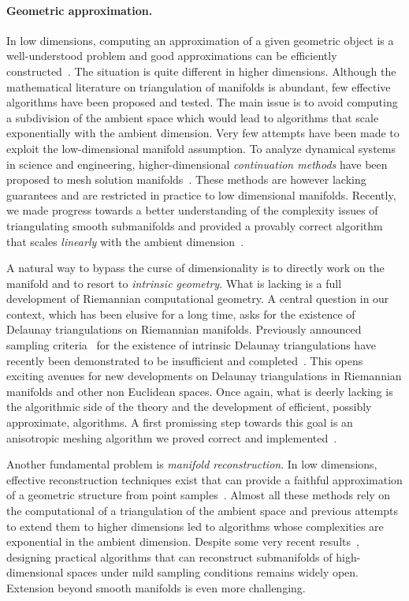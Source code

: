 \paragraph{Geometric approximation.}
In low dimensions, computing an approximation of a given geometric object is a well-understood problem and good approximations can be efficiently constructed~\cite{geometrica-bcmrv-ms-06,he-gtmg-2001}.  The situation is quite different in higher dimensions.  Although the mathematical literature on triangulation of manifolds is abundant, few effective algorithms have been proposed and tested.  The main issue is to avoid computing a subdivision of the ambient space which would lead to algorithms that scale exponentially with the ambient dimension. Very few attempts have been made to exploit the  low-dimensional manifold assumption.
To analyze {dynamical systems} in science and engineering, higher-dimensional {\em continuation methods} have been proposed to mesh solution manifolds~\cite{mh-mpc-2002}. These methods are however lacking guarantees and are restricted in practice to low dimensional manifolds. 
Recently, we made progress towards a better understanding of the complexity issues of triangulating smooth submanifolds and provided a provably correct algorithm that scales {\em linearly} with the ambient dimension~\cite{boissonnat2010meshing}. 

A natural way to bypass the curse of dimensionality is to directly work on the manifold and to resort to {\em intrinsic geometry}. What is lacking is a full development of Riemannian computational geometry. A central question in our context, which has been elusive for a long time, asks for the existence of Delaunay triangulations on Riemannian manifolds. Previously announced sampling criteria~\cite{leibon2000} for the existence of intrinsic Delaunay triangulations have recently been demonstrated to be insufficient and completed~\cite{boissonnat2012stab}. This opens exciting avenues for new developments on Delaunay triangulations in Riemannian manifolds and other non Euclidean spaces. Once again, what is deerly lacking is the algorithmic side of the theory and the development of efficient, possibly approximate, algorithms.  A first promissing step towards this goal is an anisotropic meshing algorithm we proved correct and implemented~\cite{bwy-luam-08}.

Another fundamental problem is {\em manifold reconstruction}.  In low dimensions, effective reconstruction techniques exist that can provide a faithful approximation of a geometric structure from point samples~\cite{dey-csr-2007}. %
Almost all these methods rely on the computational of a triangulation of the ambient space and previous attempts to extend them to higher dimensions led to algorithms whose complexities are exponential in the ambient dimension.  Despite some very recent results~\cite{geometrica-7142i}, designing practical algorithms that can reconstruct submanifolds of high-dimensional spaces under mild sampling conditions remains widely open. Extension beyond smooth manifolds 
is even more challenging.

